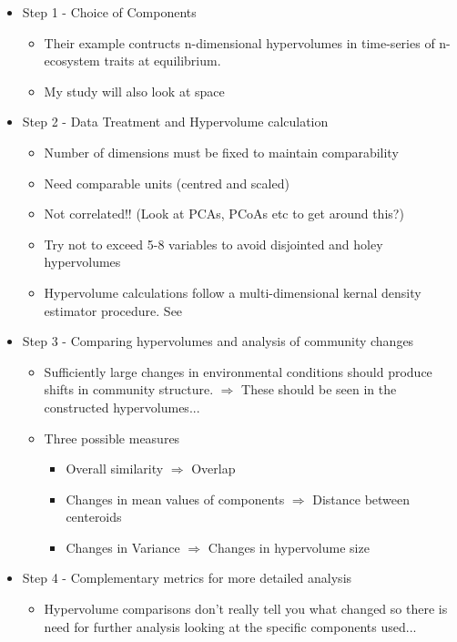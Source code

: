 	\begin{itemize}
		\item Step 1 - Choice of Components
		\begin{itemize}
			\item Their example contructs n-dimensional hypervolumes in time-series of n-ecosystem traits at equilibrium.
			\item My study will also look at space
		\end{itemize}
		
		\item Step 2 - Data Treatment and Hypervolume calculation
		\begin{itemize}
			\item Number of dimensions must be fixed to maintain comparability
			\item Need comparable units (centred and scaled)
			\item Not correlated!! (Look at PCAs, PCoAs etc to get around this?)
			\item Try not to exceed 5-8 variables to avoid disjointed and holey hypervolumes
			\item Hypervolume calculations follow a multi-dimensional kernal density estimator procedure. See \cite{Blonder2014}   
		\end{itemize}
		
		\item Step 3 - Comparing hypervolumes and analysis of community changes
		\begin{itemize}
			\item Sufficiently large changes in environmental conditions should produce shifts in community structure. $\Rightarrow$ These should be seen in the constructed hypervolumes...
			\item Three possible measures
			\begin{itemize}
				\item Overall similarity $\Rightarrow$ Overlap
				\item Changes in mean values of components $\Rightarrow$ Distance between centeroids
				\item Changes in Variance $\Rightarrow$ Changes in hypervolume size 
			\end{itemize}
		\end{itemize}
		
		\item Step 4 - Complementary metrics for more detailed analysis
		\begin{itemize}
			\item Hypervolume comparisons don't really tell you what changed so there is  need for further analysis looking at the specific components used...
		\end{itemize}
 

\end{itemize}
